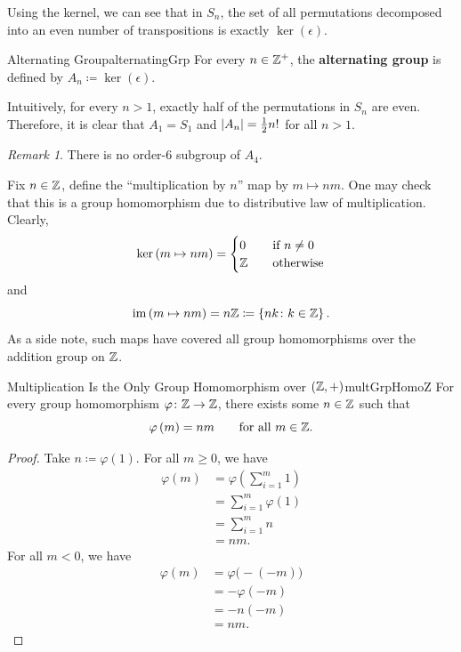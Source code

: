 \documentclass[math]{amznotes}
\theoremstyle{remark}
\newtheorem*{remark}{Remark}
\newcommand{\kernel}[1]{\ker\left(#1\right)}
\newcommand{\img}[1]{\mathrm{im}\left(#1\right)}
\newcommand{\0}{\mathbf{0}}
\newcommand{\1}{\mathbf{1}}
\begin{document}
Using the kernel, we can see that in $S_n$, the set of all permutations decomposed into an even number of transpositions is exactly $\kernel{\epsilon}$.
\begin{dfnbox}{Alternating Group}{alternatingGrp}
    For every $n \in \mathbb{Z}^+$, the {\color{red} \textbf{alternating group}} is defined by $A_n \coloneqq \kernel{\epsilon}$.
\end{dfnbox}
Intuitively, for every $n > 1$, exactly half of the permutations in $S_n$ are even. Therefore, it is clear that $A_1 = S_1$ and ${\left\lvert {A_n} \right\rvert} = \frac{1}{2}n!$ for all $n > 1$.
\begin{notebox}
    \begin{remark}
        There is no order-$6$ subgroup of $A_4$.
    \end{remark}
\end{notebox}
Fix $n \in \mathbb{Z}$, define the ``multiplication by $n$'' map by $m \mapsto nm$. One may check that this is a group homomorphism due to distributive law of multiplication. Clearly, 
\begin{equation*}
    \kernel{m \mapsto nm} = \begin{cases}
        0 & \quad\textrm{if } n \neq 0 \\
        \Z & \quad\textrm{otherwise}
    \end{cases}
\end{equation*}
and 
\begin{equation*}
    \img{m \mapsto nm} = n\Z \coloneqq \left\{nk \colon k \in \Z\right\}.
\end{equation*}
As a side note, such maps have covered all group homomorphisms over the addition group on $\mathbb{Z}$.
\begin{probox}{\small Multiplication Is the Only Group Homomorphism over $\left(\mathbb{Z}, +\right)$}{multGrpHomoZ}
    For every group homomorphism $\varphi \colon \mathbb{Z} \to \mathbb{Z}$, there exists some $n \in \mathbb{Z}$ such that 
    \begin{equation*}
        \varphi\left(m\right) = nm \qquad\textrm{for all } m \in \mathbb{Z}.
    \end{equation*}
    \tcblower
    \begin{proof}
        Take $n \coloneqq \varphi\left(1\right)$. For all $m \geq 0$, we have 
        \begin{align*}
            \varphi\left(m\right) & = \varphi\left(\sum_{i = 1}^{m}1\right) \\
            & = \sum_{i = 1}^{m}\varphi\left(1\right) \\
            & = \sum_{i = 1}^{m}n \\
            & = nm.
        \end{align*}
        For all $m < 0$, we have 
        \begin{align*}
            \varphi\left(m\right) & = \varphi\bigl(-\left(-m\right)\bigr) \\
            & = -\varphi\left(-m\right) \\
            & = -n\left(-m\right) \\
            & = nm.
        \end{align*}
    \end{proof}
\end{probox}
\end{document}

